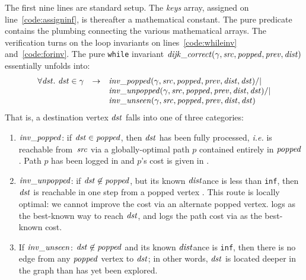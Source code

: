 The first nine lines are standard setup.
The \emph{keys} array, assigned on line~\ref{code:assigninf},
is thereafter a mathematical constant.
The pure predicate  contains the plumbing connecting the
various mathematical arrays.
The verification turns on the loop
invariants on lines~\ref{code:whileinv} and~\ref{code:forinv}.  The pure \texttt{while} invariant $\mathit{dijk\_correct}(\gamma, \mathit{src}, \mathit{popped}, \mathit{prev}, \mathit{dist})$ essentially unfolds into:
\[
\begin{array}{lcl}
\forall \m{dst}.~\m{dst} \in \gamma & -> & \m{inv\_popped}(\gamma, \m{src}, \m{popped}, \m{prev}, \m{dist}, \m{dst}) /| \null \\
&&\m{inv\_unpopped}(\gamma, \m{src}, \m{popped}, \m{prev}, \m{dist}, \m{dst}) /| \null \\
&&\m{inv\_unseen}(\gamma, \m{src}, \m{popped}, \m{prev}, \m{dist}, \m{dst})
\end{array}
\]
That is, a destination vertex $\mathit{dst}$ falls into one of three
categories:
\begin{enumerate}
\item $\mathit{inv\_popped}$: if $\mathit{dst} \in \mathit{popped}$, 
then $\mathit{dst}$ has been fully processed, \emph{i.e.}  is reachable from~$\mathit{src}$
via a globally-optimal path $p$ contained entirely in $\mathit{popped}$.  Path $p$ has been logged in  and $p$'s cost is given in .


\item $\mathit{inv\_unpopped}$: if $\mathit{dst} \not \in \mathit{popped}$, but its known $\mathit{dist}$ance is less than
\texttt{inf}, then $\mathit{dst}$ is reachable in one step from a popped vertex .
This route is locally optimal: we cannot improve the cost via an alternate popped vertex.
 logs
 as the best-known way to reach $\mathit{dst}$, and 
logs the path cost via  as the best-known cost.
\item If $\mathit{inv\_unseen}$: $\mathit{dst} \not \in \mathit{popped}$ and its known $\mathit{dist}$ance is \texttt{inf}, then
there is no edge from any $\mathit{popped}$ vertex to $\mathit{dst}$; in other words, $\mathit{dst}$ is located deeper in the graph
than has yet been explored.
\end{enumerate}
